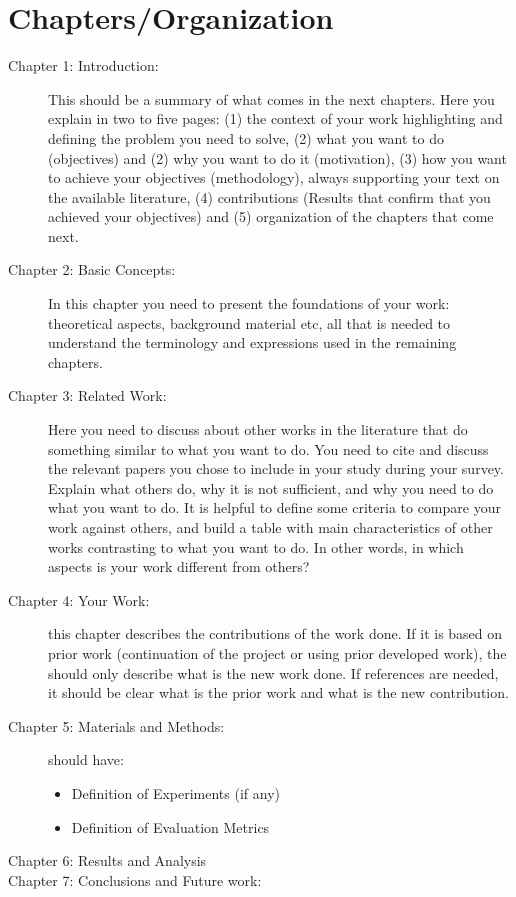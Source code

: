 {\section{Chapters/Organization}
\begin{description}
   \item[Chapter 1: Introduction:]
This should be a summary of what comes in the next chapters. Here you explain in two to five
pages: (1) the context of your work highlighting and defining the problem you need to solve, (2)
what you want to do (objectives) and (2) why you want to do it (motivation), (3) how you want to
achieve your objectives (methodology), always supporting your text on the available literature, (4)
contributions (Results that confirm that you achieved your objectives) and (5) organization of the
chapters that come next.
\item[Chapter 2: Basic Concepts:]
In this chapter you need to present the foundations of your work: theoretical aspects, background
material etc, all that is needed to understand the terminology and expressions used in the remaining
chapters.
\item[Chapter 3: Related Work:]
Here you need to discuss about other works in the literature that do something similar to what
you want to do. You need to cite and discuss the relevant papers you chose to include in your study
during your survey. Explain what others do, why it is not sufficient, and why you need to do what
you want to do. It is helpful to define some criteria to compare your work against others, and
build a table with main characteristics of other works contrasting to what you want to do. In other
words, in which aspects is your work different from others?
\item[Chapter 4: Your Work:] this chapter describes the contributions of the work done. If it is based on prior work (continuation of the project or using prior developed work), the should only describe what is the new work done. If references are needed, it should be clear what is the prior work and what is the new contribution.
\item[Chapter 5: Materials and Methods:] should have:
   \begin{itemize}
      \item Definition of Experiments (if any)
      \item Definition of Evaluation Metrics
   \end{itemize}
\item[Chapter 6: Results and Analysis]
\item[Chapter 7: Conclusions and Future work:] 

\end{description}}
